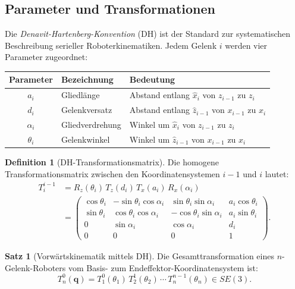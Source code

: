 ﻿\documentclass[a4paper,12pt]{article}
\theoremstyle{definition}
\newtheorem{definition}{Definition}
\newtheorem{satz}{Satz}
\begin{document}
\subsection{Parameter und Transformationen}

Die \emph{Denavit-Hartenberg-Konvention} (DH) ist der Standard zur systematischen Beschreibung serieller Roboterkinematiken. Jedem Gelenk $i$ werden vier Parameter zugeordnet:

\begin{center}
\begin{tabular}{cll}
	\toprule
	Parameter & Bezeichnung & Bedeutung \\
	\midrule
	$a_i$     & Gliedlänge  & Abstand entlang $\hat{x}_i$ von $z_{i-1}$ zu $z_i$ \\
	$d_i$     & Gelenkversatz & Abstand entlang $\hat{z}_{i-1}$ von $x_{i-1}$ zu $x_i$ \\
	$\alpha_i$ & Gliedverdrehung & Winkel um $\hat{x}_i$ von $z_{i-1}$ zu $z_i$ \\
	$\theta_i$ & Gelenkwinkel  & Winkel um $\hat{z}_{i-1}$ von $x_{i-1}$ zu $x_i$ \\
	\bottomrule
\end{tabular}
\end{center}

\begin{definition}[DH-Transformationsmatrix]
	Die homogene Transformationsmatrix zwischen den Koordinatensystemen $i-1$ und $i$ lautet:
	\begin{align*}
		T_i^{i-1} &= R_z(\theta_i)\, T_z(d_i)\, T_x(a_i)\, R_x(\alpha_i) \\
		&= \begin{pmatrix}
			\cos\theta_i & -\sin\theta_i \cos\alpha_i &  \sin\theta_i \sin\alpha_i & a_i\cos\theta_i \\
			\sin\theta_i &  \cos\theta_i \cos\alpha_i & -\cos\theta_i \sin\alpha_i & a_i\sin\theta_i \\
			0            &  \sin\alpha_i              &  \cos\alpha_i              & d_i             \\
			0            &  0                         &  0                         & 1
		\end{pmatrix}.
	\end{align*}
\end{definition}

\begin{satz}[Vorwärtskinematik mittels DH]
\label{satz:fk_dh}
	Die Gesamttransformation eines $n$-Gelenk-Roboters vom Basis- zum Endeffektor-Koordinatensystem ist:
	\[
		T_n^0(\mathbf{q}) = T_1^0(\theta_1)\, T_2^1(\theta_2)\, \cdots\, T_n^{n-1}(\theta_n) \in SE(3).
	\]
\end{satz}
\end{document}
